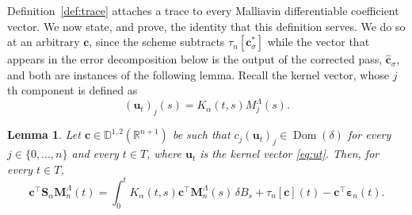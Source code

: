 \documentclass[11pt, a4paper]{article}
\theoremstyle{theoremstyle}
\newtheorem{lemma}[theorem]{Lemma}
\theoremstyle{definitionstyle}
\DeclareMathOperator{\Dom}{\operatorname{Dom}}
\begin{document}
Definition~\ref{def:trace} attaches a trace to every Malliavin differentiable coefficient vector. We now state, and prove, the identity that this definition serves. We do so at an arbitrary $\mathbf c$, since the scheme subtracts $\tau_n[\mathbf c^*_\sigma]$ while the vector that appears in the error decomposition below is the output of the corrected pass, $\hat{\mathbf c}_\sigma$, and both are instances of the following lemma. Recall the kernel vector, whose $j$th component is defined as
\begin{equation}\label{eq:ut}
    (\mathbf u_t)_j(s) = K_\alpha(t, s)M_j^\Lambda(s).
\end{equation}

\begin{lemma}\label{lem:trace_identity}
    Let $\mathbf c \in \mathbb D^{1, 2}(\mathbb R^{n+1})$ be such that $c_j(\mathbf u_t)_j \in \Dom(\delta)$ for every $j \in \{0, \dots , n\}$ and every $t \in T$, where $\mathbf u_t$ is the kernel vector \eqref{eq:ut}. Then, for every $t \in T$,
    \begin{equation}\label{eq:trace_identity}
        \mathbf c^\top \mathbf S_\alpha \mathbf M_n^\Lambda(t) = \int_0^t K_\alpha(t, s)\mathbf c^\top \mathbf M_n^\Lambda(s)\, \delta B_s + \tau_n[\mathbf c](t) - \mathbf c^\top \boldsymbol \varepsilon_n(t).
    \end{equation}
\end{lemma}
\end{document}
